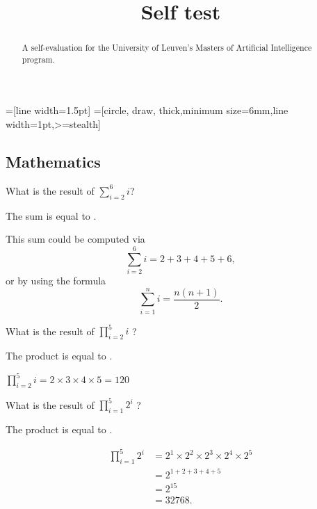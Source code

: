 \documentclass{ximera}
\title{Self test}
\begin{document}
\begin{abstract}
A self-evaluation for the University of Leuven's Masters of Artificial
Intelligence program.
\end{abstract}
\maketitle

\usetikzlibrary{arrows,positioning} 
\usetikzlibrary{arrows,shapes,backgrounds,through,shadows}
\usetikzlibrary{decorations.pathmorphing}
\usetikzlibrary{calc}
=[line width=1.5pt]
=[circle, draw,%
thick,minimum size=6mm,line width=1pt,>=stealth]  %

\subsection*{Mathematics}

\begin{question}
What is the result of $\sum_{i=2}^6 i$?
\begin{solution}
The sum is equal to .
\end{solution}
This sum could be computed via
\[
\sum_{i=2}^6 i = 2 + 3 + 4 + 5 + 6,
\]
or by using the formula
\[
\sum_{i=1}^n i = \frac{n(n+1)}{2}.
\]
\end{question}

\begin{question}
What is  the result of $\prod_{i=2}^{5} i$ ? 
\begin{solution}
The product is equal to .
\end{solution}
$\prod_{i=2}^5 i = 2 \times 3 \times 4 \times 5 = 120$
\end{question}

\begin{question}
What is  the result of  $\prod_{i=1}^5 2^i$  ? 
\begin{solution}
The product is equal to .
\end{solution}
\begin{align*}
\prod_{i=1}^5 2^i &= 2^1 \times 2^2 \times 2^3 \times 2^4 \times 2^5 \\
&= 2^{1 + 2 + 3 + 4 + 5} \\
&= 2^{15} \\
&= 32768. 
\end{align*}
\end{question}
\end{document}
